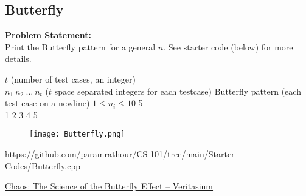 \documentclass[../../Problems]{subfiles}
\begin{document}
\subsection{Butterfly}{\label{pp:butterfly}}
\textbf{Problem Statement:}\\
Print the Butterfly pattern for a general $n$. See starter code (below) for more details.
\begin{testcases}
	{$t$ \hfill(number of test cases, an integer)\\
	$n_1\ n_2\ \ldots\ n_t$ \hfill($t$ space separated integers for each testcase)}
	{Butterfly pattern \hfill(each test case on a newline)}
	{$1 \leq n_i \leq 10$}
	{5\\1 2 3 4 5}
	{\vspace{-2em}
	\begin{figure}[H]
	\texttt{[image: Butterfly.png]}
	\end{figure}
	}
	{https://github.com/paramrathour/CS-101/tree/main/Starter Codes/Butterfly.cpp}
\end{testcases}
\begin{funvideo}
\href{https://youtu.be/fDek6cYijxI}{Chaos: The Science of the Butterfly Effect -- Veritasium}
\end{funvideo}
\end{document}

